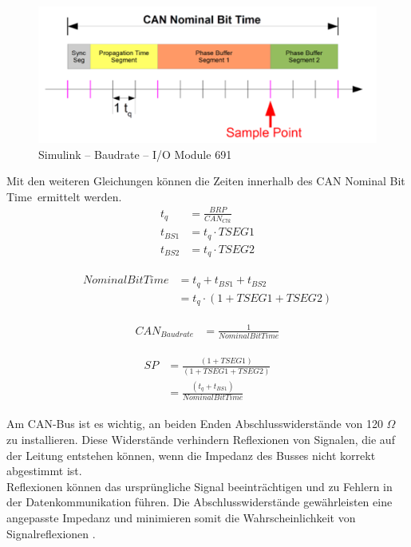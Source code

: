 \pagebreak[1]
\begin{figure}[!ht]
	\begin{center}
		\includegraphics[width=1\textwidth]{img/4_simulink/IO691_Baudrate.png}
		\caption{Simulink – Baudrate – I/O Module 691 \cite{speedgoat:IO691:CAN_Message}}
		\label{IO691_Konfigurieren:img:Baudrate}
	\end{center}
\end{figure}
\pagebreak[1]

Mit den weiteren Gleichungen können die Zeiten innerhalb des \frqq CAN Nominal Bit Time\flqq\ ermittelt werden.
\begin{align}
	\label{eq:tq}
	t_{q}   & = \frac{BRP}{CAN_{Clk}} \\
	t_{BS1} & = t_{q}  \cdot TSEG1    \\
	t_{BS2} & = t_{q}  \cdot TSEG2
\end{align}

\begin{align}
	\begin{split}
		NominalBitTime & = t_{q} + t_{BS1} + t_{BS2}        \\
		               & = t_{q}  \cdot (1 + TSEG1 + TSEG2)
	\end{split}
\end{align}

\begin{align}
	CAN_{Baudrate} & = \frac{1}{NominalBitTime}
\end{align}

\begin{align}
	\begin{split}
		SP & = \frac{(1 + TSEG1)}{(1 + TSEG1 + TSEG2)} \\
		   & = \frac{(t_q + t_{BS1})}{NominalBitTime}
	\end{split}
\end{align}

Am CAN-Bus ist es wichtig, an beiden Enden Abschlusswiderstände von 120 $\Omega$ zu installieren. Diese Widerstände verhindern Reflexionen von Signalen, die auf der Leitung entstehen können, wenn die Impedanz des Busses nicht korrekt abgestimmt ist.\\
Reflexionen können das ursprüngliche Signal beeinträchtigen und zu Fehlern in der Datenkommunikation führen. Die Abschlusswiderstände gewährleisten eine angepasste Impedanz und minimieren somit die Wahrscheinlichkeit von Signalreflexionen \cite{speedgoat:IO691:CAN_Message}.
